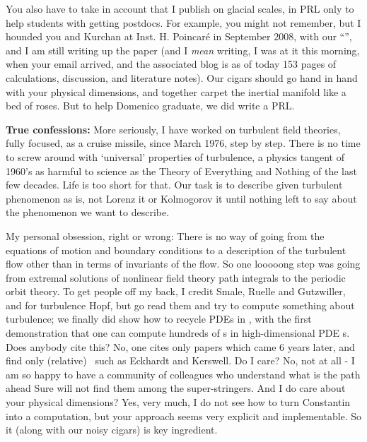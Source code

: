 \begin{description}
You also have to take in account that
I publish on glacial scales, in PRL only to help students
with getting postdocs. For example, you might not remember, but I hounded
you and Kurchan  at Inst. H. Poincar\'e in September 2008, with our
``{\optPart}'', and I am still writing up
 {the
paper} (and I \emph{mean} writing, I was at it this morning,
when your email arrived, and the associated blog is as of today 153 pages
of calculations, discussion, and literature notes). Our cigars should go
hand in hand with your physical dimensions, and together carpet the
inertial manifold like a bed of roses. But to help Domenico graduate, we
did write a PRL.

\textbf{True confessions:} More seriously, I have worked on turbulent
field theories, fully focused, as a cruise missile, since
{March 1976}, step by step. There is no time to screw around with
`universal' properties of turbulence, a physics tangent of 1960's as
harmful to science as the Theory of Everything and Nothing of the last few
decades. Life is too short for that. Our task is to describe given
turbulent phenomenon as is, not Lorenz it or Kolmogorov it until nothing
left to say about the phenomenon we want to describe.

My personal obsession, right or wrong: There is no way of going from the
equations of motion and boundary conditions to a description of the
turbulent flow other than in terms of invariants of the flow. So one
looooong step was going from extremal solutions of nonlinear field theory
path integrals to the periodic orbit theory. To get people off my back, I
credit Smale, Ruelle and Gutzwiller, and
for turbulence Hopf, but go read them and try to compute
something about turbulence; we finally did show how to recycle PDEs in
, with the first demonstration that one can
compute hundreds of \po s in high-dimensional PDE \statesp s. Does
anybody cite this? No, one cites only papers which came 6 years later,
and find only (relative) \eqva\, such as Eckhardt and
Kerswell. Do I care? No, not at all - I am so happy to have a
community of colleagues who understand what is the path ahead Sure will
not find them among the super-stringers. And I do care about your
physical dimensions? Yes, very much, I do not see how to turn
Constantin into a computation, but your
approach seems very explicit and implementable. So it (along with our
noisy cigars) is key ingredient.


\end{description}


